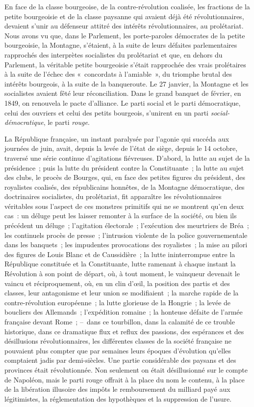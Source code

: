 \documentclass[twoside]{book} %
\begin{document}
En face de la classe bourgeoise, de la contre-révolution coalisée, les fractions de la petite bourgeoisie et de la classe paysanne qui avaient déjà été révolutionnaires, devaient s’unir au défenseur attitré des intérêts révolutionnaires, au prolétariat. Nous avons vu que, dans le Parlement, les porte-paroles démocrates de la petite bourgeoisie, la Montagne, s’étaient, à la suite de leurs défaites parlementaires rapprochés des interprètes socialistes du prolétariat et que, en dehors du Parlement, la véritable petite bourgeoisie s’était rapprochée des vrais prolétaires à la suite de l’échec des « concordats à l’amiable », du triomphe brutal des intérêts bourgeois, à la suite de la banqueroute. Le 27 janvier, la Montagne et les socialistes avaient fêté leur réconciliation. Dans le grand banquet de février, en 1849, on renouvela le pacte d’alliance. Le parti social et le parti démocratique, celui des ouvriers et celui des petits bourgeois, s’unirent en un parti \emph{social-démocratique}, le parti \emph{rouge}.\par
La République française, un instant paralysée par l’agonie qui succéda aux journées de juin, avait, depuis la levée de l’état de siège, depuis le 14 octobre, traversé une série continue d’agitations fiévreuses. D’abord, la lutte au sujet de la présidence ; puis la lutte du président contre la Constituante ; la lutte au sujet des clubs, le procès de Bourges, qui, en face des petites figures du président, des royalistes coalisés, des républicains honnêtes, de la Montagne démocratique, des doctrinaires socialistes, du prolétariat, fit apparaître les révolutionnaires véritables sous l’aspect de ces monstres primitifs qui ne se montrent qu’en deux cas : un déluge peut les laisser remonter à la surface de la société, ou bien ils précédent un déluge ; l’agitation électorale ; l’exécution des meurtriers de Bréa ; les continuels procès de presse ; l’intrusion violente de la police gouvernementale dans les banquets ; les impudentes provocations des royalistes ; la mise au pilori des figures de Louis Blanc et de Caussidière ; la lutte ininterrompue entre la République constituée et la Constituante, lutte ramenant à chaque instant la Révolution à son point de départ, où, à tout moment, le vainqueur devenait le vaincu et réciproquement, où, en un clin d’œil, la position des partis et des classes, leur antagonisme et leur union se modifiaient ; la marche rapide de la contre-révolution européenne ; la lutte glorieuse de la Hongrie ; la levée de boucliers des Allemands ; l’expédition romaine ; la honteuse défaite de l’armée française devant Rome ; – dans ce tourbillon, dans la calamité de ce trouble historique, dans ce dramatique flux et reflux des passions, des espérances et des désillusions révolutionnaires, les différentes classes de la société française ne pouvaient plus compter que par semaines leurs époques d’évolution qu’elles comptaient jadis par demi-siècles. Une partie considérable des paysans et des provinces était révolutionnée. Non seulement on était désillusionné sur le compte de Napoléon, mais le parti rouge offrait à la place du nom le contenu, à la place de la libération illusoire des impôts le remboursement du milliard payé aux légitimistes, la réglementation des hypothèques et la suppression de l’usure.\par
\end{document}
